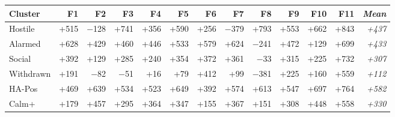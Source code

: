 {\renewcommand{\tabcolsep}{7pt}
\begin{tabular}{lrrrrrrrrrrrr}
\toprule
Cluster & F1 & F2 & F3 & F4 & F5 & F6 & F7 & F8 & F9 & F10 & F11 & \textit{Mean} \\
\midrule
Hostile   & +515 & $-$128 & +741 & +356 & +590 & +256 & $-$379 & +793 & +553 & +662 & +843 & \textit{+437} \\
Alarmed   & +628 & +429 & +460 & +446 & +533 & +579 & +624 & $-$241 & +472 & +129 & +699 & \textit{+433} \\
Social    & +392 & +129 & +285 & +240 & +354 & +372 & +361 & $-$33 & +315 & +225 & +732 & \textit{+307} \\
Withdrawn & +191 & $-$82 & $-$51 & +16 & +79 & +412 & +99 & $-$381 & +225 & +160 & +559 & \textit{+112} \\
HA-Pos    & +469 & +639 & +534 & +523 & +649 & +392 & +574 & +613 & +547 & +697 & +764 & \textit{+582} \\
Calm+     & +179 & +457 & +295 & +364 & +347 & +155 & +367 & +151 & +308 & +448 & +558 & \textit{+330} \\
\bottomrule
\end{tabular}
}
